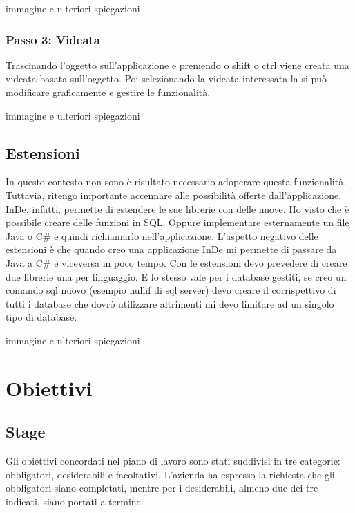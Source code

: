 \todo immagine e ulteriori spiegazioni

\subsubsection{Passo 3: Videata}
Trascinando l'oggetto sull'applicazione e premendo o shift o ctrl viene creata una videata basata sull'oggetto. Poi selezionando la videata interessata la si può modificare graficamente e gestire le funzionalità.


\todo immagine e ulteriori spiegazioni

\subsection{Estensioni}
In questo contesto non sono è risultato necessario adoperare questa funzionalità. Tuttavia, ritengo importante accennare alle possibilità offerte dall'applicazione. InDe, infatti, permette di estendere le sue librerie con delle nuove. Ho visto che è possibile creare delle funzioni in SQL. Oppure implementare esternamente un file Java o C\# e quindi richiamarlo nell'applicazione. 
L'aspetto negativo delle estensioni è che quando creo una applicazione InDe mi permette di passare da Java a C\# e viceversa in poco tempo. Con le estensioni devo prevedere di creare due librerie una per linguaggio. E lo stesso vale per i database gestiti, se creo un comando sql nuovo (esempio nullif di sql server) devo creare il corrispettivo di tutti i database che dovrò utilizzare altrimenti mi devo limitare ad un singolo tipo di database.


\todo immagine e ulteriori spiegazioni

\section{Obiettivi}

\subsection{Stage}
Gli obiettivi concordati nel piano di lavoro sono stati suddivisi in tre categorie: obbligatori, desiderabili e facoltativi. L'azienda ha espresso la richiesta che gli obbligatori siano completati, mentre per i desiderabili, almeno due dei tre indicati, siano portati a termine. \\

